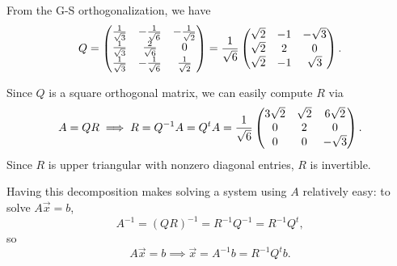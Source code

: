 \documentclass[10pt]{article}
\begin{document}
From the G-S orthogonalization, we have 
\[ Q = \begin{pmatrix} \frac{1}{\sqrt{3}} & -\frac{1}{\sqrt{6}} & -\frac{1}{\sqrt{2}} \\ \frac{1}{\sqrt{3}} & \frac{2}{\sqrt{6}} & 0 \\ \frac{1}{\sqrt{3}} & -\frac{1}{\sqrt{6}} & \frac{1}{\sqrt{2}} \end{pmatrix} = \frac{1}{\sqrt{6}} \begin{pmatrix} \sqrt{2} & -1 & -\sqrt{3} \\ \sqrt{2} & 2 & 0 \\ \sqrt{2} & -1 & \sqrt{3} \end{pmatrix}. \]

Since $Q$ is a square orthogonal matrix, we can easily compute $R$ via 
\[ A = QR \implies R = Q^{-1} A = Q^t A 
 = \frac{1}{\sqrt{6}} \begin{pmatrix} 3\sqrt{2} & \sqrt{2} & 6\sqrt{2} \\ 0 & 2 & 0 \\ 0 & 0 & -\sqrt{3} \end{pmatrix}. \]
Since $R$ is upper triangular with nonzero diagonal entries, $R$ is invertible. %

Having this decomposition makes solving a system using $A$ relatively easy: to solve $A\vec{x} = b$, 
\[ A^{-1} = (QR)^{-1} = R^{-1} Q^{-1} = R^{-1} Q^t, \]
so 
\[ A \vec{x} = b \implies \vec{x} = A^{-1} b = R^{-1} Q^t b. \]
\end{document}
